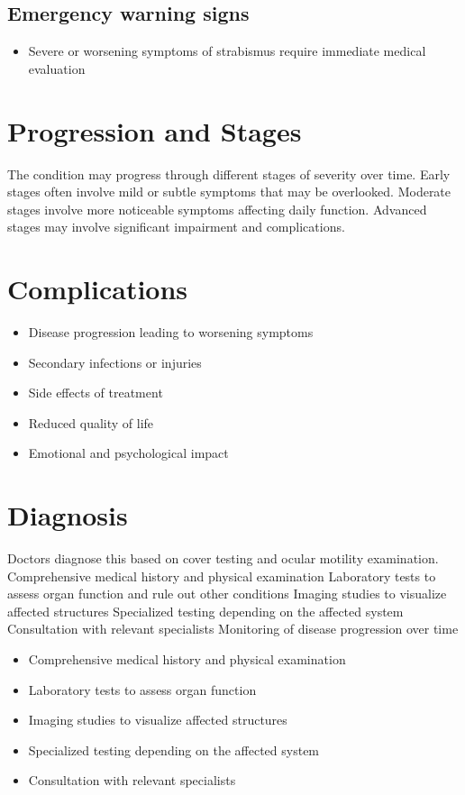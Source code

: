 \subsection{Emergency warning signs}
\begin{itemize}[noitemsep]
  \item Severe or worsening symptoms of strabismus require immediate medical evaluation
\end{itemize}
\section{Progression and Stages}
The condition may progress through different stages of severity over time. Early stages often involve mild or subtle symptoms that may be overlooked. Moderate stages involve more noticeable symptoms affecting daily function. Advanced stages may involve significant impairment and complications.
\section{Complications}
\begin{itemize}[noitemsep]
  \item Disease progression leading to worsening symptoms
  \item Secondary infections or injuries
  \item Side effects of treatment
  \item Reduced quality of life
  \item Emotional and psychological impact
\end{itemize}
\section{Diagnosis}
Doctors diagnose this based on cover testing and ocular motility examination. Comprehensive medical history and physical examination Laboratory tests to assess organ function and rule out other conditions Imaging studies to visualize affected structures Specialized testing depending on the affected system Consultation with relevant specialists Monitoring of disease progression over time

\begin{itemize}[noitemsep]
  \item Comprehensive medical history and physical examination
  \item Laboratory tests to assess organ function
  \item Imaging studies to visualize affected structures
  \item Specialized testing depending on the affected system
  \item Consultation with relevant specialists
\end{itemize}
